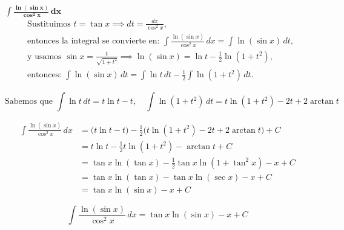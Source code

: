 $\displaystyle \mathbf{\int \frac{\ln(\sin x)}{\cos^{2} x}\,dx}$
\nopagebreak
\begin{align*}
    &\text{Sustituimos } t = \tan x \implies dt = \frac{dx}{\cos^2 x}, \\[2pt]
    &\text{entonces la integral se convierte en: } 
    \int \frac{\ln(\sin x)}{\cos^2 x}\,dx = \int \ln(\sin x)\, dt, \\[2pt]
    &\text{y usamos } \sin x = \frac{t}{\sqrt{1+t^2}} \implies \ln(\sin x) = \ln t - \frac{1}{2} \ln(1+t^2), \\[2pt]
    &\text{entonces: } \int \ln(\sin x)\, dt = \int \ln t\, dt - \frac{1}{2} \int \ln(1+t^2)\, dt.
\end{align*}

\[
\text{Sabemos que } \int \ln t\, dt = t \ln t - t, \quad \int \ln(1+t^2)\, dt = t \ln(1+t^2) - 2t + 2\arctan t
\]

\begin{align*}
    \int \frac{\ln(\sin x)}{\cos^2 x}\,dx 
    &= \big(t \ln t - t\big) - \frac{1}{2}\big(t \ln(1+t^2) - 2t + 2\arctan t\big) + C \\[2pt]
    &= t \ln t - \frac{1}{2} t \ln(1+t^2) - \arctan t + C \\[2pt]
    &= \tan x \ln(\tan x) - \frac{1}{2} \tan x \ln(1+\tan^2 x) - x + C \\[2pt]
    &= \tan x \ln(\tan x) - \tan x \ln(\sec x) - x + C \\[2pt]
    &= \tan x \ln(\sin x) - x + C
\end{align*}

\[
\boxed{\displaystyle 
\int \frac{\ln(\sin x)}{\cos^{2} x}\,dx = \tan x \ln(\sin x) - x + C
}
\]
